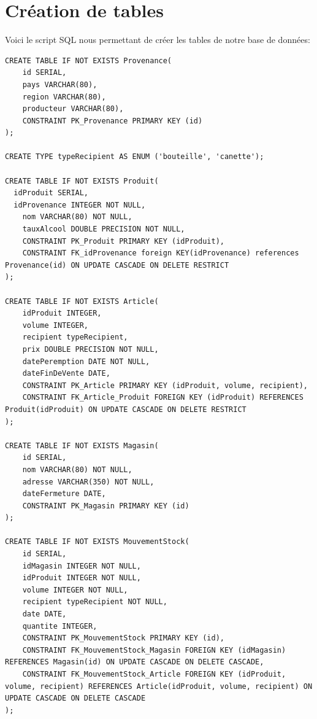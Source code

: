 \documentclass[12pt]{report}
\begin{document}
    \section*{Création de tables}

    Voici le script SQL nous permettant de créer les tables de notre base de données:
    \newline
    \newline
    \begin{lstlisting}[breaklines=true]
    CREATE TABLE IF NOT EXISTS Provenance(
    id SERIAL,
    pays VARCHAR(80),
    region VARCHAR(80),
    producteur VARCHAR(80),
    CONSTRAINT PK_Provenance PRIMARY KEY (id)
);

CREATE TYPE typeRecipient AS ENUM ('bouteille', 'canette');

CREATE TABLE IF NOT EXISTS Produit(
  idProduit SERIAL,
  idProvenance INTEGER NOT NULL,
    nom VARCHAR(80) NOT NULL,
    tauxAlcool DOUBLE PRECISION NOT NULL,
    CONSTRAINT PK_Produit PRIMARY KEY (idProduit),
    CONSTRAINT FK_idProvenance foreign KEY(idProvenance) references Provenance(id) ON UPDATE CASCADE ON DELETE RESTRICT
);

CREATE TABLE IF NOT EXISTS Article(
    idProduit INTEGER,
    volume INTEGER,
    recipient typeRecipient,
    prix DOUBLE PRECISION NOT NULL,
    datePeremption DATE NOT NULL,
    dateFinDeVente DATE,
    CONSTRAINT PK_Article PRIMARY KEY (idProduit, volume, recipient),
    CONSTRAINT FK_Article_Produit FOREIGN KEY (idProduit) REFERENCES Produit(idProduit) ON UPDATE CASCADE ON DELETE RESTRICT
);

CREATE TABLE IF NOT EXISTS Magasin(
    id SERIAL,
    nom VARCHAR(80) NOT NULL,
    adresse VARCHAR(350) NOT NULL,
    dateFermeture DATE,
    CONSTRAINT PK_Magasin PRIMARY KEY (id)
);

CREATE TABLE IF NOT EXISTS MouvementStock(
    id SERIAL,
    idMagasin INTEGER NOT NULL,
    idProduit INTEGER NOT NULL,
    volume INTEGER NOT NULL,
    recipient typeRecipient NOT NULL,
    date DATE,
    quantite INTEGER,
    CONSTRAINT PK_MouvementStock PRIMARY KEY (id),
    CONSTRAINT FK_MouvementStock_Magasin FOREIGN KEY (idMagasin) REFERENCES Magasin(id) ON UPDATE CASCADE ON DELETE CASCADE,
    CONSTRAINT FK_MouvementStock_Article FOREIGN KEY (idProduit, volume, recipient) REFERENCES Article(idProduit, volume, recipient) ON UPDATE CASCADE ON DELETE CASCADE
);


\end{lstlisting}
\end{document}
